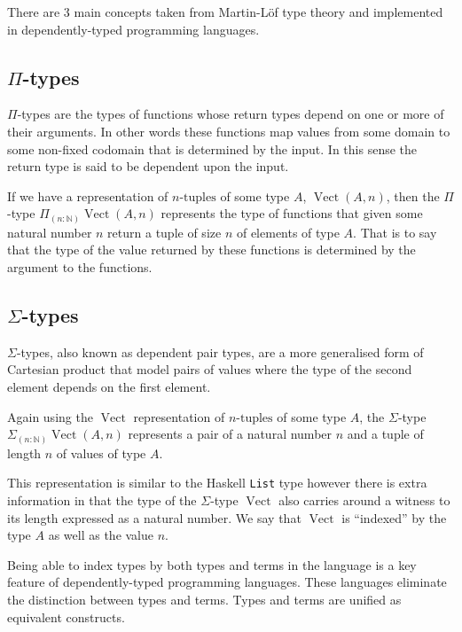 \documentclass[a4paper, notitlepage]{report}
\begin{document}
There are 3 main concepts taken from Martin-Löf type theory and implemented in
dependently-typed programming languages.

\subsection{\texorpdfstring{$\Pi$}{Pi}-types}
\label{sec:orgedbd633}
\(\Pi\)-types are the types of functions whose return types depend on one or more of
their arguments. In other words these functions map values from some domain to
some non-fixed codomain that is determined by the input. In this sense the
return type is said to be dependent upon the input.

If we have a representation of \(n\textrm{-tuples}\) of some type \(A\),
\(\operatorname{Vect}(A,n)\), then the \(\Pi\)-type \(\Pi_{(n \mathbin{:} {\mathbb N})}
\operatorname{Vect}(A,n)\) represents the type of functions that given some
natural number \(n\) return a tuple of size \(n\) of elements of type \(A\). That is
to say that the type of the value returned by these functions is determined by
the argument to the functions.

\subsection{\texorpdfstring{$\Sigma$}{Sigma}-types}
\label{sec:orgfc9ecca}
\(\Sigma\)-types, also known as dependent pair types, are a more generalised form of
Cartesian product that model pairs of values where the type of the second
element depends on the first element.

Again using the \(\operatorname{Vect}\) representation of \(n\textrm{-tuples}\) of
some type \(A\), the \(\Sigma\)-type \(\Sigma_{(n \mathbin{:} {\mathbb N})}
\operatorname{Vect}(A,n)\) represents a pair of a natural number \(n\) and a tuple
of length \(n\) of values of type \(A\).

This representation is similar to the Haskell \texttt{List} type however there is extra
information in that the type of the \(\Sigma\)-type \(\operatorname{Vect}\) also
carries around a witness to its length expressed as a natural number. We say
that \(\operatorname{Vect}\) is ``indexed'' by the type \(A\) as well as the value
\(n\).

Being able to index types by both types and terms in the language is a key
feature of dependently-typed programming languages. These languages eliminate
the distinction between types and terms. Types and terms are unified as
equivalent constructs.
\end{document}
